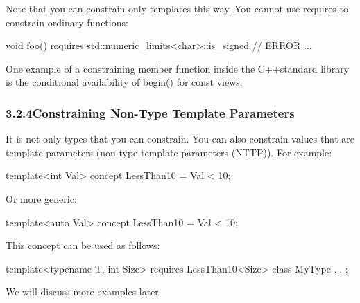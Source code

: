 Note that you can constrain only templates this way. You cannot use requires to constrain ordinary functions:

\begin{cpp}
void foo() requires std::numeric_limits<char>::is_signed // ERROR
{
	...
}
\end{cpp}

One example of a constraining member function inside the C++standard library is the conditional availability of begin() for const views.


\subsubsection*{ 3.2.4\hspace{0.2cm}Constraining Non-Type Template Parameters}

It is not only types that you can constrain. You can also constrain values that are template parameters (non-type template parameters (NTTP)). For example:

\begin{cpp}
template<int Val>
concept LessThan10 = Val < 10;
\end{cpp}

Or more generic:

\begin{cpp}
template<auto Val>
concept LessThan10 = Val < 10;
\end{cpp}

This concept can be used as follows:

\begin{cpp}
template<typename T, int Size>
requires LessThan10<Size>
class MyType {
	...
};
\end{cpp}

We will discuss more examples later.










